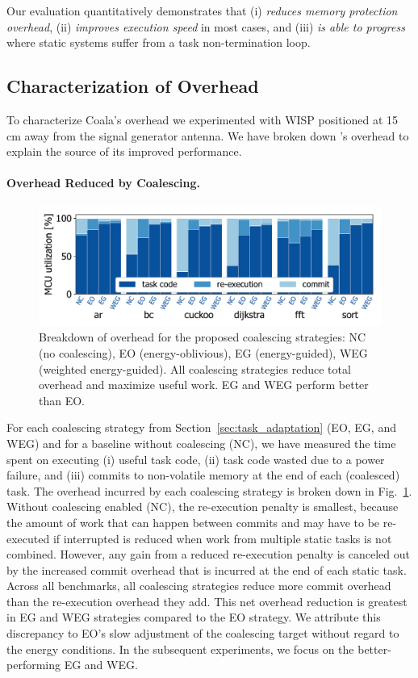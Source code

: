 Our evaluation quantitatively demonstrates that \sys (i) \emph{reduces memory
protection overhead}, (ii) \emph{improves execution speed} in most cases,
and (iii) \emph{is able to progress} where static systems suffer from a task non-termination loop. 
%
\subsection{Characterization of Overhead}
\label{sec:coala_overhead}

To characterize Coala's overhead we experimented with WISP positioned at
15\,cm away from the signal generator antenna.
We have broken down \sys's overhead to explain the source of its improved performance.

\paragraph{Overhead Reduced by Coalescing.}
\label{sec:overhead-coalescing}

\begin{figure}
    \centering
    \includegraphics[width=.8\columnwidth]{figures/coalEfficiency}
    \caption{Breakdown of overhead for the proposed coalescing strategies:
    NC (no coalescing), EO (energy-oblivious), EG (energy-guided), WEG
    (weighted energy-guided). All coalescing strategies reduce total
    overhead and maximize useful work. EG and WEG perform better than EO.}
    \label{fig:overallOverheadBreakdown}
\end{figure}

For each coalescing strategy from Section~\ref{sec:task_adaptation} (EO, EG,
and WEG) and for a baseline without coalescing (NC), we have measured the time
spent on executing (i) useful task code, (ii) task code wasted due to a power failure, and
(iii) commits to non-volatile memory at the end of each (coalesced)
task.
%
The overhead incurred by each coalescing strategy is broken down in
Fig.~\ref{fig:overallOverheadBreakdown}. Without coalescing enabled (NC), the
re-execution penalty is smallest, because the amount of work that can happen
between commits and may have to be re-executed if interrupted is reduced when
work from multiple static tasks is not combined.
%
However, any gain from a reduced re-execution penalty is canceled out by
the increased commit overhead that is incurred at the end of each static
task.
%
Across all benchmarks, all coalescing strategies reduce more commit overhead
than the re-execution overhead they add.
%
This net overhead reduction is greatest in EG and WEG strategies compared
to the EO strategy. We attribute this discrepancy to EO's slow adjustment
of the coalescing target without regard to the energy conditions.
%
In the subsequent experiments, we focus on the better-performing EG and WEG.


